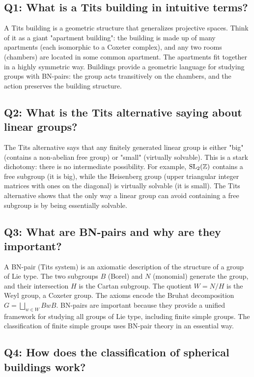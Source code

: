 \subsection*{Q1: What is a Tits building in intuitive terms?}

A Tits building is a geometric structure that generalizes projective spaces. Think of it as a giant "apartment building": the building is made up of many apartments (each isomorphic to a Coxeter complex), and any two rooms (chambers) are located in some common apartment. The apartments fit together in a highly symmetric way. Buildings provide a geometric language for studying groups with BN-pairs: the group acts transitively on the chambers, and the action preserves the building structure.

\subsection*{Q2: What is the Tits alternative saying about linear groups?}

The Tits alternative says that any finitely generated linear group is either "big" (contains a non-abelian free group) or "small" (virtually solvable). This is a stark dichotomy: there is no intermediate possibility. For example, \(\operatorname{SL}_2(\mathbb{Z})\) contains a free subgroup (it is big), while the Heisenberg group (upper triangular integer matrices with ones on the diagonal) is virtually solvable (it is small). The Tits alternative shows that the only way a linear group can avoid containing a free subgroup is by being essentially solvable.

\subsection*{Q3: What are BN-pairs and why are they important?}

A BN-pair (Tits system) is an axiomatic description of the structure of a group of Lie type. The two subgroups \(B\) (Borel) and \(N\) (monomial) generate the group, and their intersection \(H\) is the Cartan subgroup. The quotient \(W = N/H\) is the Weyl group, a Coxeter group. The axioms encode the Bruhat decomposition \(G = \bigsqcup_{w \in W} B w B\). BN-pairs are important because they provide a unified framework for studying all groups of Lie type, including finite simple groups. The classification of finite simple groups uses BN-pair theory in an essential way.

\subsection*{Q4: How does the classification of spherical buildings work?}

